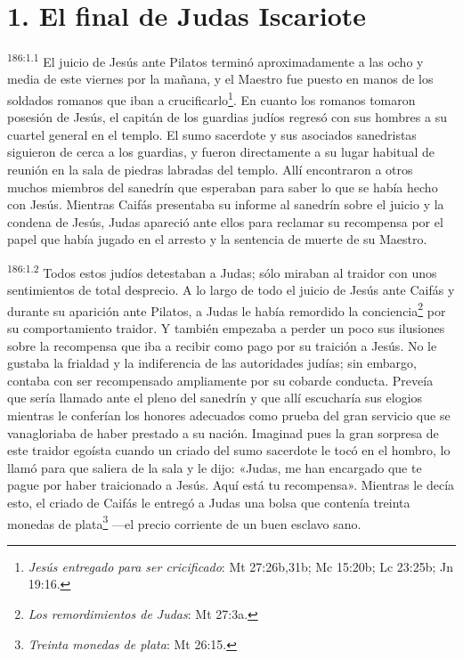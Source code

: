 \section*{1. El final de Judas Iscariote}
\par 
\textsuperscript{186:1.1} El juicio de Jesús ante Pilatos terminó aproximadamente a las ocho y media de este viernes por la mañana, y el Maestro fue puesto en manos de los soldados romanos que iban a crucificarlo\footnote{\textit{Jesús entregado para ser cricificado}: Mt 27:26b,31b; Mc 15:20b; Lc 23:25b; Jn 19:16.}. En cuanto los romanos tomaron posesión de Jesús, el capitán de los guardias judíos regresó con sus hombres a su cuartel general en el templo. El sumo sacerdote y sus asociados sanedristas siguieron de cerca a los guardias, y fueron directamente a su lugar habitual de reunión en la sala de piedras labradas del templo. Allí encontraron a otros muchos miembros del sanedrín que esperaban para saber lo que se había hecho con Jesús. Mientras Caifás presentaba su informe al sanedrín sobre el juicio y la condena de Jesús, Judas apareció ante ellos para reclamar su recompensa por el papel que había jugado en el arresto y la sentencia de muerte de su Maestro.

\par 
\textsuperscript{186:1.2} Todos estos judíos detestaban a Judas; sólo miraban al traidor con unos sentimientos de total desprecio. A lo largo de todo el juicio de Jesús ante Caifás y durante su aparición ante Pilatos, a Judas le había remordido la conciencia\footnote{\textit{Los remordimientos de Judas}: Mt 27:3a.} por su comportamiento traidor. Y también empezaba a perder un poco sus ilusiones sobre la recompensa que iba a recibir como pago por su traición a Jesús. No le gustaba la frialdad y la indiferencia de las autoridades judías; sin embargo, contaba con ser recompensado ampliamente por su cobarde conducta. Preveía que sería llamado ante el pleno del sanedrín y que allí escucharía sus elogios mientras le conferían los honores adecuados como prueba del gran servicio que se vanagloriaba de haber prestado a su nación. Imaginad pues la gran sorpresa de este traidor egoísta cuando un criado del sumo sacerdote le tocó en el hombro, lo llamó para que saliera de la sala y le dijo: «Judas, me han encargado que te pague por haber traicionado a Jesús. Aquí está tu recompensa». Mientras le decía esto, el criado de Caifás le entregó a Judas una bolsa que contenía treinta monedas de plata\footnote{\textit{Treinta monedas de plata}: Mt 26:15.} ---el precio corriente de un buen esclavo sano.

